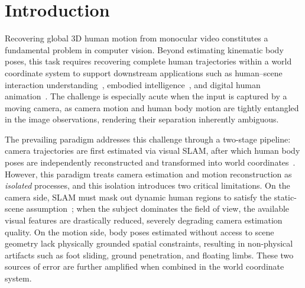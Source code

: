 \documentclass[runningheads]{llncs}
\begin{document}
\section{Introduction}
\label{sec:intro}
Recovering global 3D human motion from monocular video constitutes a fundamental problem in computer vision. Beyond estimating kinematic body poses, this task requires recovering complete human trajectories within a world coordinate system to support downstream applications such as human--scene interaction understanding~\cite{Hassan2019,RICH2022}, embodied intelligence~\cite{Embodied2022,EmbodiedScan2024}, and digital human animation~\cite{DigitalHuman2024}. The challenge is especially acute when the input is captured by a moving camera, as camera motion and human body motion are tightly entangled in the image observations, rendering their separation inherently ambiguous.

The prevailing paradigm addresses this challenge through a two-stage pipeline: camera trajectories are first estimated via visual SLAM, after which human body poses are independently reconstructed and transformed into world coordinates~\cite{TRAM2024,SLAHMR2023,PACE2024}. However, this paradigm treats camera estimation and motion reconstruction as \textit{isolated} processes, and this isolation introduces two critical limitations. On the camera side, SLAM must mask out dynamic human regions to satisfy the static-scene assumption~\cite{DynaSLAM2018}; when the subject dominates the field of view, the available visual features are drastically reduced, severely degrading camera estimation quality. On the motion side, body poses estimated without access to scene geometry lack physically grounded spatial constraints, resulting in non-physical artifacts such as foot sliding, ground penetration, and floating limbs. These two sources of error are further amplified when combined in the world coordinate system.
\end{document}
